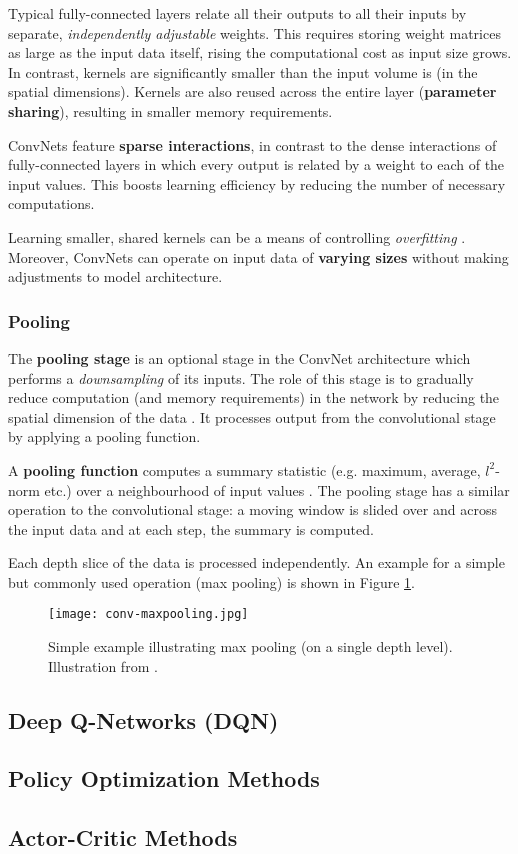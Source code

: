 Typical fully-connected layers relate all their outputs to all their inputs by separate, \emph{independently adjustable} weights.
This requires storing weight matrices as large as the input data itself, rising the computational cost as input size grows.
In contrast, kernels are significantly smaller than the input volume is (in the spatial dimensions).
Kernels are also reused across the entire layer (\textbf{parameter sharing}), resulting in smaller memory requirements.

ConvNets feature \textbf{sparse interactions}, in contrast to the dense interactions of fully-connected layers in which every output is related by a weight to each of the input values.
This boosts learning efficiency by reducing the number of necessary computations.

Learning smaller, shared kernels can be a means of controlling \emph{overfitting} \cite{Goodfellow-et-al-2016}. Moreover, ConvNets can operate on input data of \textbf{varying sizes} without making adjustments to model architecture.


\subsubsection{Pooling}
The \textbf{pooling stage} is an optional stage in the ConvNet architecture which performs a \emph{downsampling} of its inputs.
The role of this stage is to gradually reduce computation (and memory requirements) in the network by reducing the spatial dimension of the data \cite{stanford-convnets}.
It processes output from the convolutional stage by applying a pooling function.

A \textbf{pooling function} computes a summary statistic (e.g. maximum, average, $l^2$-norm etc.) over a neighbourhood of input values \cite{Goodfellow-et-al-2016}.
The pooling stage has a similar operation to the convolutional stage:
a moving window is slided over and across the input data and at each step, the summary is computed.

Each depth slice of the data is processed independently.
An example for a simple but commonly used operation (max pooling) is shown in Figure \ref{fig:maxpooling}.

\begin{figure}[h]
    \centering
    \texttt{[image: conv-maxpooling.jpg]}
    \caption{Simple example illustrating max pooling (on a single depth level). Illustration from \cite{stanford-convnets}.}
    \label{fig:maxpooling}
\end{figure}

\subsection{Deep Q-Networks (DQN)} \label{section:dqn}

\subsection{Policy Optimization Methods} \label{section:policy-opt}

\subsection{Actor-Critic Methods} \label{section:actor-critic}
